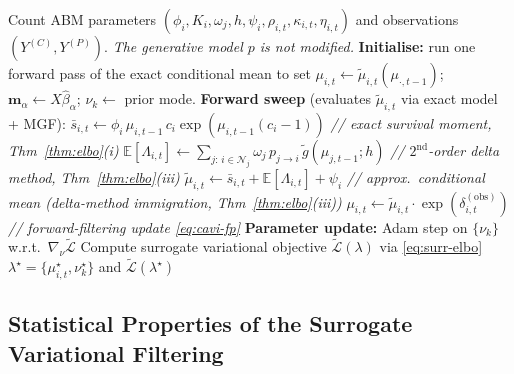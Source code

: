\documentclass[review,12pt]{elsarticle}
\theoremstyle{definition}
\begin{document}
\begin{algorithm}[H]
\caption{SMFVB: deterministic surrogate variational filtering for count ABMs.
  The latent-field update is a forward-filtering approximation to coordinate ascent
  (drops future-process contributions; see \S\ref{sec:cavi-update}).
  Parameter updates use Adam \citep{kingma2013}; Adam does \emph{not} guarantee
  monotone increase of $\tilde{\mathcal{L}}$.
  Surrogate objective $\tilde{\mathcal{L}}$ is not a lower bound on $\log p(Y)$.}\label{alg:smfvb}
\begin{algorithmic}[1]
\Require Count ABM parameters $(\phi_i,K_i,\omega_j,h,\psi_i,\rho_{i,t},\kappa_{i,t},\eta_{i,t})$
         and observations $(Y^{(C)},Y^{(P)})$.
         \emph{The generative model $p$ is not modified.}
\State \textbf{Initialise:} run one forward pass of the exact conditional mean
       to set $\mu_{i,t}\leftarrow\tilde\mu_{i,t}(\mu_{\cdot,t-1})$;
       $\mathbf{m}_\alpha\leftarrow X\hat\beta_\alpha$;
       $\nu_k\leftarrow$ prior mode.
\Repeat
  \State \textbf{Forward sweep} (evaluates $\tilde\mu_{i,t}$ via exact model + MGF):
         \label{line:fwd-start}
    \State $\bar{s}_{i,t}
           \leftarrow\phi_i\,\mu_{i,t-1}\,c_i\exp(\mu_{i,t-1}(c_i-1))$
           \hfill \emph{// exact survival moment, Thm~\ref{thm:elbo}(i)}
    \State $\mathbb{E}[\Lambda_{i,t}]
           \leftarrow\sum_{j:\,i\in\mathcal{N}_j}\omega_j\,p_{j\to i}\,
           \tilde{g}(\mu_{j,t-1};h)$
           \hfill \emph{// $2^\mathrm{nd}$-order delta method, Thm~\ref{thm:elbo}(iii)}
    \State $\tilde\mu_{i,t}\leftarrow\bar{s}_{i,t}+\mathbb{E}[\Lambda_{i,t}]+\psi_i$
           \hfill \emph{// approx.\ conditional mean (delta-method immigration, Thm~\ref{thm:elbo}(iii))}
    \State $\mu_{i,t}\leftarrow\tilde\mu_{i,t}
           \cdot\exp(\delta_{i,t}^{(\mathrm{obs})})$
           \hfill \emph{// forward-filtering update \eqref{eq:cavi-fp}}
  \EndFor \label{line:fwd-end}
  \State \textbf{Parameter update:}
         Adam step on $\{\nu_k\}$ w.r.t.\ $\nabla_\nu\tilde{\mathcal{L}}$
  \State Compute surrogate variational objective $\tilde{\mathcal{L}}(\lambda)$ via \eqref{eq:surr-elbo}
\State \Return $\lambda^\star=\{\mu^\star_{i,t},\nu^\star_k\}$ and $\tilde{\mathcal{L}}(\lambda^\star)$
\end{algorithmic}
\end{algorithm}

\subsection{Statistical Properties of the Surrogate Variational Filtering}
\label{sec:vi-convergence}
\end{document}
